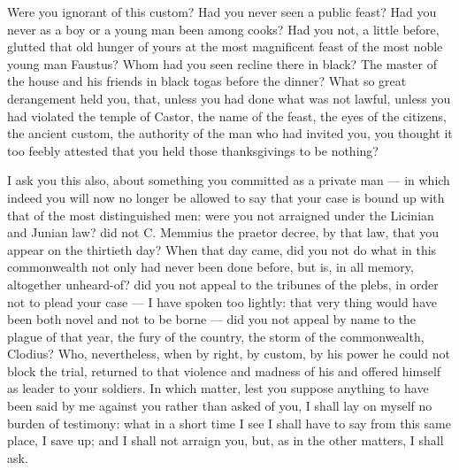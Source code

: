  Were you ignorant of this custom? Had you never seen a public feast? Had you never as a boy or a young man been among cooks? Had you not, a little before, glutted that old hunger of yours at the most magnificent feast of the most noble young man Faustus? Whom had you seen recline there in black? The master of the house and his friends in black togas before the dinner? What so great derangement held you, that, unless you had done what was not lawful, unless you had violated the temple of Castor, the name of the feast, the eyes of the citizens, the ancient custom, the authority of the man who had invited you, you thought it too feebly attested that you held those thanksgivings to be nothing?

 I ask you this also, about something you committed as a private man --- in which indeed you will now no longer be allowed to say that your case is bound up with that of the most distinguished men: were you not arraigned under the Licinian and Junian law? did not C. Memmius the praetor decree, by that law, that you appear on the thirtieth day? When that day came, did you not do what in this commonwealth not only had never been done before, but is, in all memory, altogether unheard-of? did you not appeal to the tribunes of the plebs, in order not to plead your case --- I have spoken too lightly: that very thing would have been both novel and not to be borne --- did you not appeal by name to the plague of that year, the fury of the country, the storm of the commonwealth, Clodius? Who, nevertheless, when by right, by custom, by his power he could not block the trial, returned to that violence and madness of his and offered himself as leader to your soldiers. In which matter, lest you suppose anything to have been said by me against you rather than asked of you, I shall lay on myself no burden of testimony: what in a short time I see I shall have to say from this same place, I save up; and I shall not arraign you, but, as in the other matters, I shall ask.

